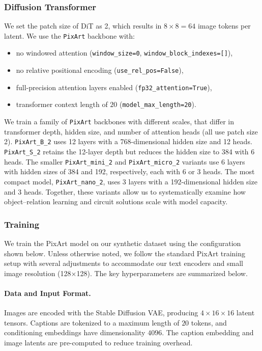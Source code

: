 \subsubsection{Diffusion Transformer}

We set the patch size of DiT as 2, which results in $8\times8=64$ image tokens per latent. 
We use the \texttt{PixArt} backbone with:
\begin{itemize}
    \item no windowed attention (\texttt{window\_size=0}, \texttt{window\_block\_indexes=[]}),
    \item no relative positional encoding (\texttt{use\_rel\_pos=False}),
    \item full-precision attention layers enabled (\texttt{fp32\_attention=True}),
    \item transformer context length of $20$ (\texttt{model\_max\_length=20}).
\end{itemize}
We train a family of \texttt{PixArt} backbones with different scales, that differ in transformer depth, hidden size, and number of attention heads (all use patch size 2). \texttt{PixArt\_B\_2} uses 12 layers with a 768-dimensional hidden size and 12 heads. \texttt{PixArt\_S\_2} retains the 12-layer depth but reduces the hidden size to 384 with 6 heads. The smaller \texttt{PixArt\_mini\_2} and \texttt{PixArt\_micro\_2} variants use 6 layers with hidden sizes of 384 and 192, respectively, each with 6 or 3 heads. The most compact model, \texttt{PixArt\_nano\_2}, uses 3 layers with a 192-dimensional hidden size and 3 heads. Together, these variants allow us to systematically examine how object–relation learning and circuit solutions scale with model capacity.



\subsubsection{Training}

We train the PixArt model on our synthetic dataset using the configuration shown below. Unless otherwise noted, we follow the standard PixArt training setup with several adjustments to accommodate our text encoders and small image resolution (128×128). The key hyperparameters are summarized below.

\paragraph{Data and Input Format.}
Images are encoded with the Stable Diffusion VAE, producing $4\times16\times16$ latent tensors. 
Captions are tokenized to a maximum length of $20$ tokens, and conditioning embeddings have dimensionality $4096$. 
The caption embedding and image latents are pre-computed to reduce training overhead.


